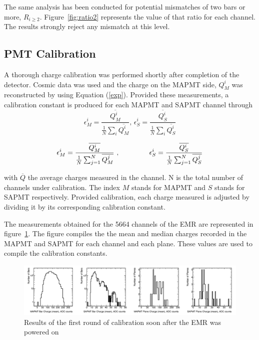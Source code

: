\documentclass[a4paper,11pt]{article}
\begin{document}
The same analysis has been conducted for potential mismatches of two bars or more, $R_{i\geq2}$. Figure~\ref{fig:ratio2} represents the value of that ratio for each
channel. The results strongly reject any mismatch at this level.

\subsection{PMT Calibration}\label{sec:calib}
A thorough charge calibration was performed shortly after completion of the detector. Cosmic data was used and the charge on the MAPMT side, $Q_M^i$ was
reconstructed by using Equation (\ref{exp}). Provided these measurements, a calibration constant is produced for each MAPMT and SAPMT channel through
\begin{equation}
\epsilon_M^i=\frac{\overline{Q_M^i}}{\frac{1}{N}\sum_{i}\overline{Q_M^i}},\,\epsilon_S^i=\frac{\overline{Q_S^i}}{\frac{1}{N}\sum_{i}\overline{Q_S^i}}
\end{equation}

\begin{equation}
\epsilon_M^i=\frac{\overline{Q_M^i}}{\frac{1}{N}\sum_{j=1}^N\overline{Q_M^j}}\ , \hspace{15mm} \epsilon_S^i=\frac{\overline{Q_S^i}}{\frac{1}{N}\sum_{j=1}^N\overline{Q_S^j}}
\end{equation}

with $\overline{Q}$ the average charges measured in the channel. N is the total number of channels under calibration. The index $M$ stands for MAPMT
and $S$ stands for SAPMT respectively. Provided calibration, each charge measured is adjusted by dividing it by its corresponding calibration constant.

The measurements obtained for the 5664 channels of the EMR are represented in figure~\ref{fig:calib}. The figure compiles the the mean and median charges
recorded in the MAPMT and SAPMT for each channel and each plane. These values are used to compile the calibration constants.

\begin{figure}[htb]
\centering
\includegraphics[width=\textwidth]{calibration_charge_distrib_cut.png}
\caption{Results of the first round of calibration soon after the EMR was powered on}
\label{fig:calib}
\end{figure}
\end{document}
